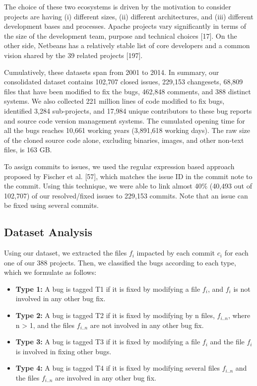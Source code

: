 \documentclass[12pt]{report}
\providecommand{\tightlist}{%
  \setlength{\itemsep}{0pt}\setlength{\parskip}{0pt}}
\begin{document}
The choice of these two ecosystems is driven by the motivation to
consider projects are having (i) different sizes, (ii) different
architectures, and (iii) different development bases and processes.
Apache projects vary significantly in terms of the size of the
development team, purpose and technical choices {[}17{]}. On the other
side, Netbeans has a relatively stable list of core developers and a
common vision shared by the 39 related projects {[}197{]}.

Cumulatively, these datasets span from 2001 to 2014. In summary, our
consolidated dataset contains 102,707 closed issues, 229,153 changesets,
68,809 files that have been modified to fix the bugs, 462,848 comments,
and 388 distinct systems. We also collected 221 million lines of code
modified to fix bugs, identified 3,284 sub-projects, and 17,984 unique
contributors to these bug reports and source code version management
systems. The cumulated opening time for all the bugs reaches 10,661
working years (3,891,618 working days). The raw size of the cloned
source code alone, excluding binaries, images, and other non-text files,
is 163 GB.

To assign commits to issues, we used the regular expression based
approach proposed by Fischer et al. {[}57{]}, which matches the issue ID
in the commit note to the commit. Using this technique, we were able to
link almost 40\% (40,493 out of 102,707) of our resolved/fixed issues to
229,153 commits. Note that an issue can be fixed using several commits.

\subsection{\texorpdfstring{Dataset
Analysis\label{sec:dataset}}{Dataset Analysis}}\label{dataset-analysis}

Using our dataset, we extracted the files \(f_i\) impacted by each
commit \(c_i\) for each one of our 388 projects. Then, we classified the
bugs according to each type, which we formulate as follows:

\begin{itemize}
\tightlist
\item
  \textbf{Type 1:} A bug is tagged T1 if it is fixed by modifying a file
  \(f_i\), and \(f_i\) is not involved in any other bug fix.
\item
  \textbf{Type 2:} A bug is tagged T2 if it is fixed by modifying by n
  files, \(f_{i..n}\), where n \textgreater{} 1, and the files
  \(f_{i..n}\) are not involved in any other bug fix.
\item
  \textbf{Type 3:} A bug is tagged T3 if it is fixed by modifying a file
  \(f_{i}\) and the file \(f_{i}\) is involved in fixing other bugs.
\item
  \textbf{Type 4:} A bug is tagged T4 if it is fixed by modifying
  several files \(f_{i..n}\) and the files \(f_{i..n}\) are involved in
  any other bug fix.
\end{itemize}
\end{document}
